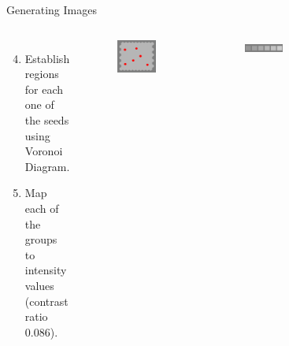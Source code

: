 \documentclass[10pt,xcolor=svgnames]{beamer} %
\begin{document}
\begin{frame}{Generating Images}
\begin{columns}
    \begin{enumerate}
        \setcounter{enumi}{3}
        \vspace{-0.5cm}
        \item Establish regions for each one of the seeds using Voronoi Diagram.
        \vspace{2cm}
        \item Map each of the groups to intensity values (contrast ratio 0.086).
    \end{enumerate}
    \begin{figure}
        \centering
        \includegraphics[width=0.8\textwidth]{pictures/img3_cut0_seed_final.png}
    \end{figure}
    \vspace{-0.62cm}
    \begin{figure}
        \centering
        \includegraphics[width=0.8\textwidth]{pictures/intensities.png}
    \end{figure}
    \vspace{-0.6cm}
    \begin{figure}
        \centering

\end{figure}
\end{columns}
\end{frame}
\end{document}
